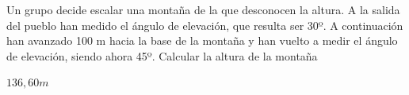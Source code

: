 \documentclass[addpoints,spanish, 12pt,a4paper]{exam}
\begin{document}
\begin{questions}

    
    
    
    
    

    


\question[2]
Un grupo decide escalar una montaña de la que desconocen la altura. A la salida del pueblo han medido
el ángulo de elevación, que resulta ser 30º. A continuación han avanzado 100 m hacia la base de la
montaña y han vuelto a medir el ángulo de elevación, siendo ahora 45º. Calcular la altura de la montaña
\begin{solution}
    $136,60 m$
\end{solution}

\addpoints
\end{questions}
\end{document}
